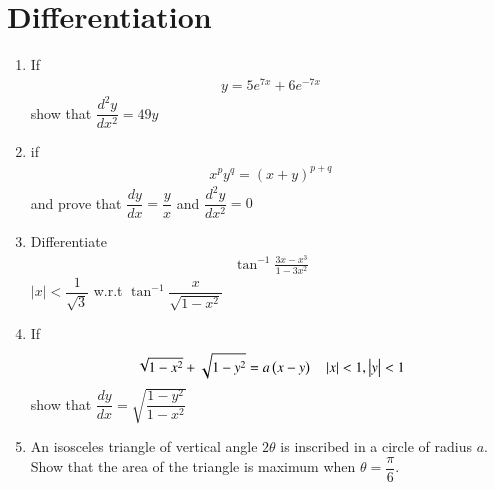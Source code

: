 \documentclass[12pt,-letter paper]{article}
\providecommand{\brak}[1]{\ensuremath{\left(#1\right)}}
\begin{document}
\section{Differentiation}

\begin{enumerate}

\item If \begin{align*}y= 5e^{7x}+6e^{-7x}\end{align*}  show that $\dfrac{d^2y}{dx^2}=49y$

\item if \begin{align*}x^py^q=(x+y)^{p+q}\end{align*} and prove that $\dfrac{dy}{dx}=\dfrac{y}{x}$ and $\dfrac{d^2y}{dx^2}=0$

\item Differentiate \begin{align*}\tan^{-1}\frac{3x-x^3}{1-3x^2}\end{align*}  $|x|<\dfrac{1}{\sqrt{3}}$ w.r.t $\tan^{-1}\dfrac{x}{\sqrt{1-x^2}}$

\item If \begin{align*}\sqrt{1-x^2}+\sqrt{1-y^2}=a\brak{x-y} \quad\abs{x}<1,\abs{y}<1\end{align*}  show that $\dfrac{dy}{dx}=\sqrt{\dfrac{1-y^2}{1-x^2}}$

 \item An isosceles triangle of vertical angle $2\theta$ is inscribed in a circle  of radius $a$. Show that the area of the triangle is maximum when $\theta =\dfrac{\pi}{6}$.

\end{enumerate}
\end{document}
